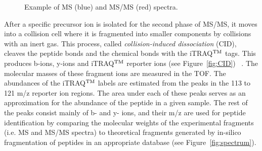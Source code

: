 \begin{figure}[htb]
\caption{Example of MS (blue) and MS/MS (red) spectra.}
\label{fig:MSandMSMSspectra}
\end{figure}

After a specific precursor ion is isolated for the second phase of MS/MS, it moves into a collision cell where it is fragmented into smaller components by collisions with an inert gas. This process, called \emph{collision-induced dissociation} (CID), cleaves the peptide bonds and the chemical bonds with the iTRAQ$^{\rm TM}$ tags. This produces b-ions, y-ions and iTRAQ$^{\rm TM}$ reporter ions (see Figure~\ref{fig:CID}) ~\citep{Ross2004}. The molecular masses of these fragment ions are measured in the TOF. The abundances of the iTRAQ$^{\rm TM}$ labels are estimated from the peaks in the 113 to 121 m/z reporter ion regions. The area under each of these peaks serves as an approximation for the abundance of the peptide in a given sample. The rest of the peaks consist mainly of b- and y- ions, and their m/z are used for peptide identification by comparing the molecular weights of the experimental fragments (i.e. MS and MS/MS spectra) to theoretical fragments generated by in-silico fragmentation of peptides in an appropriate database (see Figure~\ref{fig:spectrum}).

